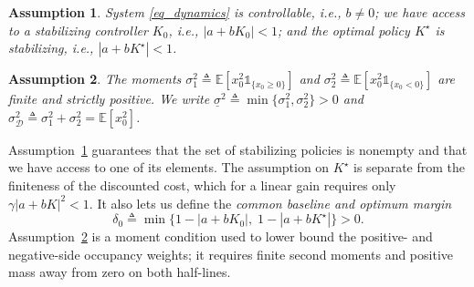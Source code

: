 \documentclass[letterpaper, 10 pt, conference]{ieeeconf}
\newcommand{\E}{\mathbb{E}}
\newcommand{\cD}{\mathcal{D}}
\newcommand{\slo}{\underline{\sigma}}
\newcommand{\ind}[1]{\mathds{1}_{#1}}
\newtheorem{assumption}{Assumption}
\newcommand{\Assum}{Assumption}
\begin{document}
\begin{assumption} \label{assumption_controllability}
    System \eqref{eq_dynamics} is controllable, i.e., $b \neq 0$; we have access to a stabilizing controller $K_{0}$, i.e., $| a + b K_{0} | < 1$; and the optimal policy $K^{\star}$ is stabilizing, i.e., $|a + b K^{\star}| < 1$.
\end{assumption}
 
\begin{assumption} \label{assumption_initial_distribution}
    The moments
    $\sigma_{1}^{2} \triangleq \E[x_{0}^{2}\ind{\{x_{0} \ge 0\}}]$ and
    $\sigma_{2}^{2} \triangleq \E[x_{0}^{2}\ind{\{x_{0} < 0\}}]$
    are finite and strictly positive. We write
    $\slo^{2} {\triangleq} \min\{\sigma_{1}^{2}, \sigma_{2}^{2}\} {>} 0$ and
    $\sigma_{\cD}^{2} {\triangleq} \sigma_{1}^{2} + \sigma_{2}^{2} {=} \E[x_{0}^{2}]$.
\end{assumption}
 
\Assum~\ref{assumption_controllability} guarantees that the set of stabilizing policies is nonempty and that we have access to one of its elements. The assumption on $K^{\star}$ is separate from the finiteness of the discounted cost, which for a linear gain requires only $\gamma|a+bK|^{2}<1$. It also lets us define the \emph{common baseline and optimum margin}
\begin{equation} \label{eq_delta_zero}
    \delta_{0} \triangleq \min\bigl\{ 1 - |a + bK_{0}|,\; 1 - |a + bK^{\star}| \bigr\} > 0 .
\end{equation}
\Assum~\ref{assumption_initial_distribution} is a moment condition used to lower bound the positive- and negative-side occupancy weights; it requires finite second moments and positive mass away from zero on both half-lines. 
\end{document}
